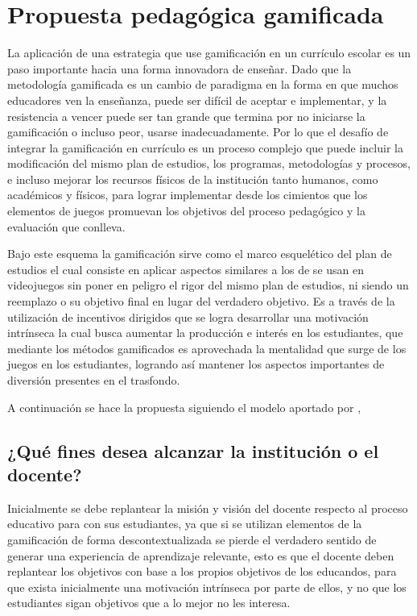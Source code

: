 %

\section{Propuesta pedagógica gamificada}

La aplicación de una estrategia que use gamificación en un currículo escolar es un paso importante hacia una 
forma innovadora de enseñar. Dado que la metodología gamificada es un cambio de paradigma en la forma en que 
muchos educadores ven la enseñanza, puede ser difícil de aceptar e implementar, y la resistencia a vencer 
puede ser tan grande que termina por no iniciarse la gamificación o incluso peor, usarse inadecuadamente. Por 
lo que el desafío de integrar la gamificación en currículo es un proceso complejo que puede incluir la 
modificación del mismo plan de estudios, los programas, metodologías y procesos, e incluso mejorar los 
recursos físicos de la institución tanto humanos, como académicos y físicos, para lograr implementar desde los 
cimientos que los elementos de juegos promuevan los objetivos del proceso pedagógico y la evaluación que 
conlleva.

Bajo este esquema la gamificación sirve como el marco esquelético del plan de estudios el cual consiste en 
aplicar aspectos similares a los de se usan en videojuegos sin poner en peligro el rigor del mismo plan de 
estudios, ni siendo un reemplazo o su objetivo final en lugar del verdadero objetivo. Es a través de la 
utilización de incentivos dirigidos que se logra desarrollar una motivación intrínseca la cual busca aumentar 
la producción e interés en los estudiantes, que mediante los métodos gamificados es aprovechada la mentalidad 
que surge de los juegos en los estudiantes, logrando así mantener los aspectos importantes de diversión 
presentes en el trasfondo.

A continuación se hace la propuesta siguiendo el modelo aportado por ,

\subsection{¿Qué fines desea alcanzar la institución o el docente?}

Inicialmente se debe replantear la misión y visión del docente respecto al proceso educativo para con sus 
estudiantes, ya que si se utilizan elementos de la gamificación de forma descontextualizada se pierde el 
verdadero sentido de generar una experiencia de aprendizaje relevante, esto es que el docente deben replantear 
los objetivos con base a los propios objetivos de los educandos, para que exista inicialmente una motivación 
intrínseca por parte de ellos, y no que los estudiantes sigan objetivos que a lo mejor no les interesa.

